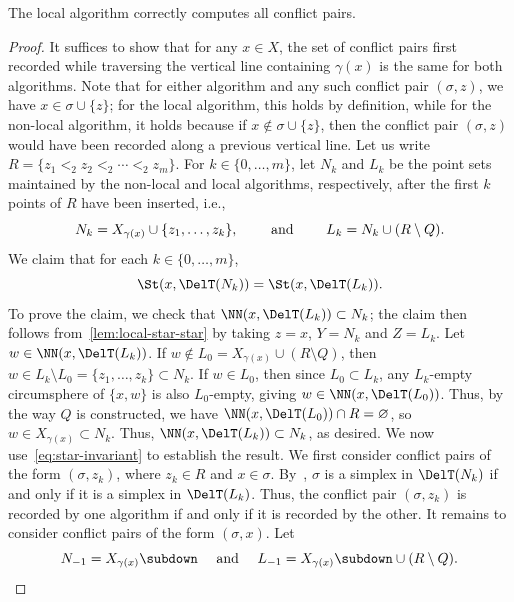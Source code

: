 %
\begin{proposition}\label{lem:local-reinsert} 
The local algorithm correctly computes all conflict pairs.
\end{proposition}
%
\begin{proof} 
    It suffices to show that for any $x\in X$, the set of conflict pairs first recorded while traversing the vertical line containing $\gamma(x)$ is the same for both algorithms.  Note that for either algorithm and any such conflict pair $(\sigma, z)$, we have $x\in \sigma\cup \{z\}$; for the local algorithm, this holds by definition, while for the non-local algorithm, it holds because if $x\not\in \sigma\cup \{z\}$, then the conflict pair $(\sigma, z)$ would have been recorded along a previous vertical line.   
%
   Let us write $R= \{z_1 <_2 z_2 <_2 \cdots <_2 z_m\}.$
    For $k\in \{0,\dots,m\}$, let $N_k$ and $L_k$ be the point sets maintained by the 
    non-local and local algorithms, respectively, after the first $k$ points of $R$ have been inserted, i.e., 
    \[
    N_k = X_{ \gamma(x)} \cup \{z_1,\dots,z_{k}\},
    \qquad \textup{ and } \qquad
    L_k = N_k \cup (R\setminus Q).
    \]
    We claim that for each $k\in \{0,\ldots, m\}$, 
    \begin{equation}\label{eq:star-invariant} 
        \St(x,\DelT(N_k))=\St(x,\DelT(L_k)).  %
    \end{equation}
    To prove the claim, we check that $\NN(x, \DelT(L_k)) \subset N_k$; the claim then follows from~\cref{lem:local-star-star} by taking $z = x$, $Y=N_k$ and $Z = L_k$.  Let  $w \in \NN(x, \DelT(L_k))$.   If $w \notin L_0=X_{ \gamma(x)}\cup (R\setminus Q)$, then $w \in L_k \setminus L_0 = \{z_1, \dots, z_{k}\} \subset N_k$.  
    If $w \in L_0$, then since $L_0 \subset L_k$, any  $L_k$-empty circumsphere of 
    $\{x, w\}$ is also $L_0$-empty, giving $w \in \NN(x, \DelT(L_0))$.   Thus, by the way $Q$ is constructed, we have $\NN(x, \DelT(L_0)) \cap R = \varnothing$,
    so $w \in X_{ \gamma(x)} \subset N_k$.  Thus, $\NN(x, \DelT(L_k)) \subset N_k$, as desired.
%
 We now use~\cref{eq:star-invariant} to establish the result.  We first consider conflict pairs of the form $(\sigma,z_k)$, where $z_k\in R$ and $x\in \sigma$.   By~,
 $\sigma$ is a simplex in $\DelT(N_k)$ if and only if it is a simplex in $\DelT(L_k)$.  Thus, the conflict pair $(\sigma,z_k)$ is recorded by one algorithm if and only if it is recorded by the other.
%
It remains to consider conflict pairs of the form $(\sigma,x)$.  Let 
\[N_{-1}=X_{\gamma(x)}{\subdown}\quad \textup{ and } \quad L_{-1}=X_{\gamma(x)}{\subdown}\cup (R\setminus Q).\]

\end{proof}
